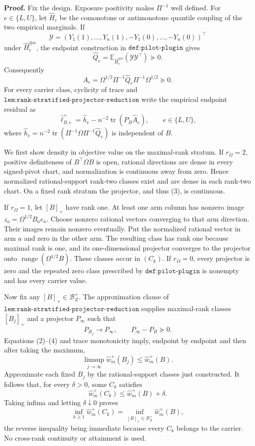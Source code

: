 \textbf{Proof.}
Fix the design.  Exposure positivity makes \(\Pi^{-1}\) well defined.  For \(e\in\{L,U\}\), let \(\widehat H_e\) be the comonotone or antimonotone quantile coupling of the two empirical marginals.  If
\[
\mathcal Y=(Y_1(1),\ldots,Y_n(1),-Y_1(0),\ldots,-Y_n(0))^{\top}
\]
under \(\widehat H_e^{\otimes n}\), the endpoint construction in \(\texttt{def:pilot-plugin}\) gives
\[
\widehat Q_e=\mathbb E_{\widehat H_e^{\otimes n}}(\mathcal Y\mathcal Y^{\top})\succeq0.
\tag{1}
\]
Consequently
\[
\widehat A_e=\Omega^{1/2}\Pi^{-1}\widehat Q_e\Pi^{-1}\Omega^{1/2}\succeq0.
\tag{2}
\]
For every carrier class, cyclicity of trace and \(\texttt{lem:rank-stratified-projector-reduction}\) write the empirical endpoint residual as
\[
\widehat\ell_{B,e}^+
=\widehat h_e-n^{-2}\operatorname{tr}(P_B\widehat A_e),
\qquad e\in\{L,U\},
\tag{3}
\]
where \(\widehat h_e=n^{-2}\operatorname{tr}(\Pi^{-1}\Omega\Pi^{-1}\widehat Q_e)\) is independent of \(B\).

We first show density in objective value on the maximal-rank stratum.  If \(r_\Omega=2\), positive definiteness of \(B^{\top}\Omega B\) is open, rational directions are dense in every signed-pivot chart, and normalization is continuous away from zero.  Hence normalized rational-support rank-two classes exist and are dense in each rank-two chart.  On a fixed rank stratum the projector, and thus (3), is continuous.

If \(r_\Omega=1\), let \([B]_+\) have rank one.  At least one arm column has nonzero image \(z_a=\Omega^{1/2}B_ae_a\).  Choose nonzero rational vectors converging to that arm direction.  Their images remain nonzero eventually.  Put the normalized rational vector in arm \(a\) and zero in the other arm.  The resulting class has rank one because maximal rank is one, and its one-dimensional projector converges to the projector onto \(\operatorname{range}(\Omega^{1/2}B)\).  These classes occur in \((C_k)\).  If \(r_\Omega=0\), every projector is zero and the repeated zero class prescribed by \(\texttt{def:pilot-plugin}\) is nonempty and has every carrier value.

Now fix any \([B]_+\in\mathcal B_Z^+\).  The approximation clause of \(\texttt{lem:rank-stratified-projector-reduction}\) supplies maximal-rank classes \([B_j]_+\) and a projector \(P_\infty\) such that
\[
P_{B_j}\longrightarrow P_\infty,
\qquad P_\infty-P_B\succeq0.
\tag{4}
\]
Equations (2)--(4) and trace monotonicity imply, endpoint by endpoint and then after taking the maximum,
\[
\limsup_{j\to\infty}\widehat w_m^+(B_j)\le\widehat w_m^+(B).
\tag{5}
\]
Approximate each fixed \(B_j\) by the rational-support classes just constructed.  It follows that, for every \(\delta>0\), some \(C_k\) satisfies
\[
\widehat w_m^+(C_k)\le\widehat w_m^+(B)+\delta.
\tag{6}
\]
Taking infima and letting \(\delta\downarrow0\) proves
\[
\inf_{k\ge1}\widehat w_m^+(C_k)
=\inf_{[B]_+\in\mathcal B_Z^+}\widehat w_m^+(B),
\tag{7}
\]
the reverse inequality being immediate because every \(C_k\) belongs to the carrier.  No cross-rank continuity or attainment is used.

